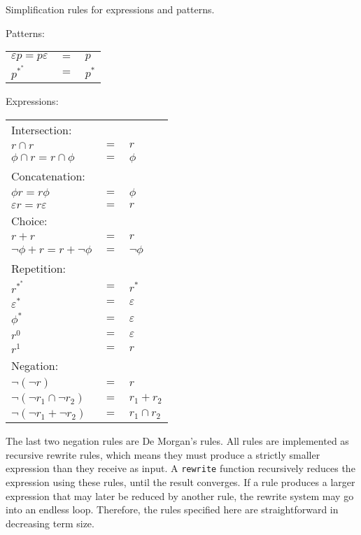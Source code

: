 \begin{defn}
   \label{defn-simplify}
   Simplification rules for expressions and patterns.

   Patterns:

   \begin{tabular}{lrl}
      $\varepsilon p = p \varepsilon$	& $=$	& $p$				\\
      $p^{*^*}$				& $=$	& $p^*$				\\
   \end{tabular}

   Expressions:

   \begin{tabular}{lrl}
      Intersection:								\\
      $r \cap r$			& $=$	& $r$				\\
      $\phi \cap r = r \cap \phi$	& $=$	& $\phi$			\\
      Concatenation:								\\
      $\phi r = r \phi$			& $=$	& $\phi$			\\
      $\varepsilon r = r \varepsilon$	& $=$	& $r$				\\
      Choice:									\\
      $r + r$				& $=$	& $r$				\\
      $\neg\phi + r = r + \neg\phi$	& $=$	& $\neg\phi$			\\
      Repetition:								\\
      $r^{*^*}$				& $=$	& $r^*$				\\
      $\varepsilon^*$			& $=$	& $\varepsilon$			\\
      $\phi^*$				& $=$	& $\varepsilon$			\\
      $r^0$				& $=$	& $\varepsilon$			\\
      $r^1$				& $=$	& $r$				\\
      Negation:									\\
      $\neg(\neg r)$			& $=$	& $r$				\\
      $\neg(\neg r_1 \cap \neg r_2)$	& $=$	& $r_1 + r_2$			\\
      $\neg(\neg r_1 + \neg r_2)$	& $=$	& $r_1 \cap r_2$		\\
   \end{tabular}
\end{defn}

The last two negation rules are De Morgan's rules. All rules are implemented as
recursive rewrite rules, which means they must produce a strictly smaller
expression than they receive as input. A \texttt{rewrite} function recursively
reduces the expression using these rules, until the result converges. If a rule
produces a larger expression that may later be reduced by another rule, the
rewrite system may go into an endless loop. Therefore, the rules specified here
are straightforward in decreasing term size.

